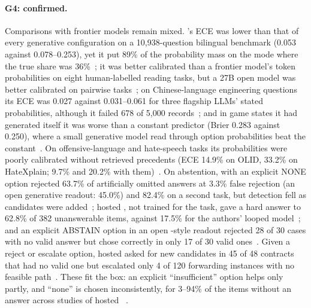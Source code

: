 \paragraph{G4: confirmed.}
Comparisons with frontier models remain mixed.
\jev{}'s ECE was lower than that of every generative configuration on a 10{,}938-question bilingual benchmark (0.053 against 0.078--0.253), yet it put 89\% of the probability mass on the mode where the true share was 36\%~\cite{arx03935}; it was better calibrated than a frontier model's token probabilities on eight human-labelled reading tasks, but a 27B open model was better calibrated on pairwise tasks~\cite{arx06625}; on Chinese-language engineering questions its ECE was 0.027 against 0.031--0.061 for three flagship LLMs' stated probabilities, although it failed 678 of 5{,}000 records~\cite{arx09896}; and in game states it had generated itself it was worse than a constant predictor (Brier 0.283 against 0.250), where a small generative model read through option probabilities beat the constant~\cite{zen23221456}\zmark{}.
On offensive-language and hate-speech tasks its probabilities were poorly calibrated without retrieved precedents (ECE 14.9\% on OLID, 33.2\% on HateXplain; 9.7\% and 20.2\% with them)~\cite{arx07953}.
On abstention, with an explicit NONE option \jev{} rejected 63.7\% of artificially omitted answers at 3.3\% false rejection (an open generative readout: 45.0\%) and 82.4\% on a second task, but detection fell as candidates were added~\cite{arx03387}; hosted \jev{}, not trained for the task, gave a hard answer to 62.8\% of 382 unanswerable items, against 17.5\% for the authors' looped model~\cite{arx07730}; and an explicit ABSTAIN option in an open \jev{}-style readout rejected 28 of 30 cases with no valid answer but chose correctly in only 17 of 30 valid ones~\cite{arx07327}.
Given a reject or escalate option, hosted \jev{} asked for new candidates in 45 of 48 contracts that had no valid one but escalated only 4 of 120 forwarding instances with no feasible path~\cite{arx06425}.
These fit the box: an explicit ``insufficient'' option helps only partly, and ``none'' is chosen inconsistently, for 3--94\% of the items without an answer across studies of hosted \jev{}~\cite{arx39496,arx03387,arx06425}.

